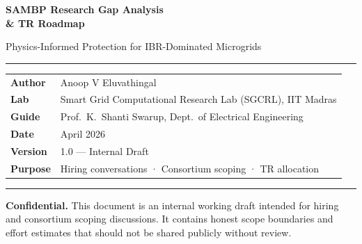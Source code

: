 \documentclass[11pt, a4paper]{article}
\begin{document}
\begin{titlepage}

\vspace*{48mm}

{\fontsize{26}{32}\selectfont\bfseries\color{navy}
SAMBP Research Gap Analysis\\[4pt]
\& TR Roadmap}

\vspace{6mm}
{\large\color{slate} Physics-Informed Protection for IBR-Dominated Microgrids}

\vspace{10mm}
\textcolor{blue}{\rule{\linewidth}{1.5pt}}
\vspace{5mm}

\begin{tabular}{@{}ll}
\textbf{Author}   & Anoop V Eluvathingal \\[3pt]
\textbf{Lab}      & Smart Grid Computational Research Lab (SGCRL), IIT Madras \\[3pt]
\textbf{Guide}    & Prof.\ K.\ Shanti Swarup, Dept.\ of Electrical Engineering \\[3pt]
\textbf{Date}     & April 2026 \\[3pt]
\textbf{Version}  & 1.0 — Internal Draft \\[3pt]
\textbf{Purpose}  & Hiring conversations · Consortium scoping · TR allocation \\
\end{tabular}

\vspace{10mm}
\textcolor{blue}{\rule{\linewidth}{0.4pt}}

\begin{warnbox}
\textbf{Confidential.} This document is an internal working draft intended for hiring
and consortium scoping discussions. It contains honest scope boundaries and effort
estimates that should not be shared publicly without review.
\end{warnbox}

\vspace{8mm}
\tableofcontents

\end{titlepage}
\end{document}
